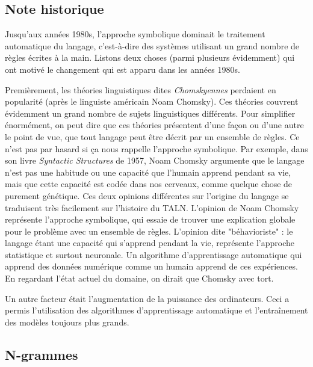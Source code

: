 \documentclass[11pt, a4paper]{report}
\begin{document}
  \subsection{Note historique}
  Jusqu'aux années 1980s, l'approche symbolique dominait le traitement automatique du langage, 
  c'est-à-dire des systèmes utilisant un grand nombre de règles écrites à la main. Listons deux
  choses (parmi plusieurs évidemment) qui ont motivé le changement qui est apparu dans les années 
  1980s. 

  Premièrement, les théories linguistiques dites \textit{Chomskyennes} perdaient en popularité
  (après le linguiste américain Noam Chomsky). Ces théories couvrent évidemment un grand nombre 
  de sujets linguistiques différents. Pour simplifier énormément, on peut dire que ces théories 
  présentent d'une façon ou d'une autre le point de vue, que tout langage peut être décrit par 
  un ensemble de règles. Ce n'est pas par hasard si ça nous rappelle l'approche symbolique. 
  Par exemple, dans son livre \textit{Syntactic Structures} de 1957, Noam Chomsky argumente 
  que le langage n'est pas une habitude ou une capacité que l'humain apprend pendant sa vie, 
  mais que cette capacité est codée dans nos cerveaux, comme quelque chose de purement génétique.
  Ces deux opinions différentes sur l'origine du langage se traduisent très facilement sur l'histoire 
  du TALN. L'opinion de Noam Chomsky représente l'approche symbolique, qui essaie de trouver une 
  explication globale pour le problème avec un ensemble de règles. L'opinion dite "béhavioriste" : 
  le langage étant une capacité qui s'apprend pendant la vie, représente l'approche statistique 
  et surtout neuronale. Un algorithme d'apprentissage automatique qui apprend des données 
  numérique comme un humain apprend de ces expériences. En regardant l'état actuel du domaine, 
  on dirait que Chomsky avec tort. 
  
  Un autre facteur était l'augmentation de la puissance des ordinateurs. Ceci a permis l'utilisation 
  des algorithmes d'apprentissage automatique et l'entraînement des modèles toujours plus grands. 

  \subsection{N-grammes}
  \cite{stanford-book-ngrams}
\end{document}
